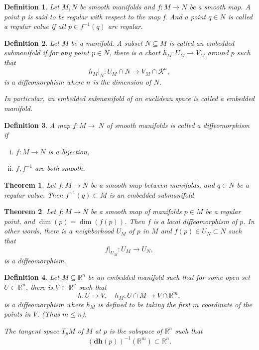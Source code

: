 \documentclass{article}
\newtheorem{theorem}{Theorem}[section]
\newtheorem{definition}{Definition}[section]
\numberwithin{equation}{section}
\begin{document}
\begin{definition}
Let $M,N$ be smooth manifolds and $f:M\to N$ be a smooth map. A point $p$ is said to be regular with respect to the map f. And a point $q\in N$ is called a regular value if all $p\in f^{-1}(q)$ are regular.
\end{definition}

\begin{definition}
Let $M$ be a manifold. A subset $N\subseteq M $ is called an embedded submanifold if for any point $p\in N$, there is a chart $h_M:U_M\to V_M$ around $p$ such that
\begin{equation*}
h_M|_N:U_M\cap N\to V_M\cap \mathcal{R}^n,
\end{equation*}
 is a diffeomorphism where $n$ is the dimension of $N$.\\
 \par In particular, an embedded submanifold of an euclidean space is called a embedded manifold. 
\end{definition}

\begin{definition}
A map $f:M\to\ N$ of smooth manifolds is called a diffeomorphism if 
\begin{enumerate}[i).]
\item $f:M\to N$ is a bijection,
\item $f,f^{-1}$ are both smooth.
\end{enumerate}
\end{definition}

\begin{theorem}
Let $f:M\to N$ be a smooth map between manifolds, and $q\in N$ be a regular value. Then $f^{-1}(q)\subset M$ is an embedded submanifold.
\end{theorem}

\begin{theorem}
Let $f:M\to N$ be a smooth map of manifolds $p\in M$ be a regular point, and $\dim(p) = \dim(f(p))$. Then $f$ is a local diffeomorphism of $p$. In other words, there is a neighborhood $U_M$ of $p$ in $M$ and $f(p)\in U_N\subset N$ such that
\begin{equation*}
f|_{U_M}:U_M\to U_N,
\end{equation*}
is a diffeomorphism. 
\end{theorem}

\begin{definition}
Let $M\subseteq \mathbb{R}^n$ be an embedded manifold such that for some open set $U\subset\mathbb{R}^n$, there is $V\subset\mathbb{R}^n$ such that
\begin{equation*}
h:U\to V, \quad h_M:U\cap M\to V\cap \mathbb{R}^m,
\end{equation*}
is a diffeomorphism where $h_M$ is defined to be taking the first $m$ coordinate of the points in $V$. (Thus $m\leq n$).\\
\par The tangent space $T_pM$ of $M$ at $p$ is the subspace of $\mathbb{R}^n$ such that
\begin{equation*}
(\mathbf{dh}(p))^{-1}(\mathbb{R}^m)\subset\mathbb{R}^n.
\end{equation*}
\end{definition}
\end{document}
